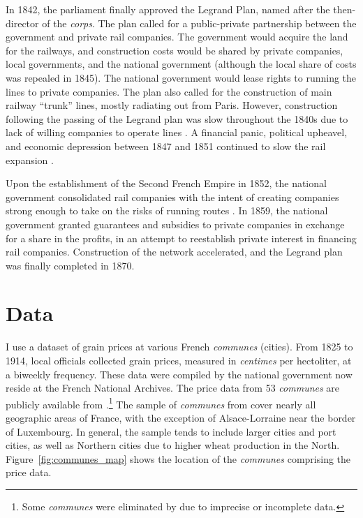 \documentclass[12pt,twoside]{article}
\begin{document}
In 1842, the parliament finally approved the Legrand Plan, named after the then-director of the \emph{corps}.
The plan called for a public-private partnership between the government and private rail companies.
The government would acquire the land for the railways, and construction costs would be shared by private companies, local governments, and the national government (although the local share of costs was repealed in 1845).
The national government would lease rights to running the lines to private companies.
The plan also called for the construction of main railway ``trunk'' lines, mostly radiating out from Paris.
However, construction following the passing of the Legrand plan was slow throughout the 1840s due to lack of willing companies to operate lines \citep{clapham}.
A financial panic, political upheavel, and economic depression between 1847 and 1851 continued to slow the rail expansion \citep{doukas}.

Upon the establishment of the Second French Empire in 1852, the national government consolidated rail companies with the intent of creating companies strong enough to take on the risks of running routes \citep{clapham}.
In 1859, the national government granted guarantees and subsidies to private companies in exchange for a share in the profits, in an attempt to reestablish private interest in financing rail companies.
Construction of the network accelerated, and the Legrand plan was finally completed in 1870.

\section{Data}

I use a dataset of grain prices at various French \emph{communes} (cities).
From 1825 to 1914, local officials collected grain prices, measured in \emph{centimes} per hectoliter, at a biweekly frequency.
These data were compiled by the national government now reside at the French National Archives.
The price data from 53 \emph{communes} are publicly available from \cite{prices}.\footnote{Some \emph{communes} were eliminated by \cite{prices} due to imprecise or incomplete data.}
The sample of \emph{communes} from \cite{prices} cover nearly all geographic areas of France, with the exception of Alsace-Lorraine near the border of Luxembourg.
In general, the sample tends to include larger cities and port cities, as well as Northern cities due to higher wheat production in the North.
Figure~\ref{fig:communes_map} shows the location of the \emph{communes} comprising the price data.
\end{document}
